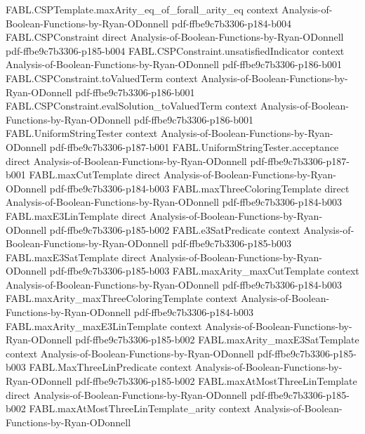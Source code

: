 \begin{theorem}
\proofstep
  {FABL.CSPTemplate.maxArity_eq_of_forall_arity_eq}
  {context}
  {Analysis-of-Boolean-Functions-by-Ryan-ODonnell}
  {pdf-ffbe9c7b3306-p184-b004}
\proofstep
  {FABL.CSPConstraint}
  {direct}
  {Analysis-of-Boolean-Functions-by-Ryan-ODonnell}
  {pdf-ffbe9c7b3306-p185-b004}
\proofstep
  {FABL.CSPConstraint.unsatisfiedIndicator}
  {context}
  {Analysis-of-Boolean-Functions-by-Ryan-ODonnell}
  {pdf-ffbe9c7b3306-p186-b001}
\proofstep
  {FABL.CSPConstraint.toValuedTerm}
  {context}
  {Analysis-of-Boolean-Functions-by-Ryan-ODonnell}
  {pdf-ffbe9c7b3306-p186-b001}
\proofstep
  {FABL.CSPConstraint.evalSolution_toValuedTerm}
  {context}
  {Analysis-of-Boolean-Functions-by-Ryan-ODonnell}
  {pdf-ffbe9c7b3306-p186-b001}
\proofstep
  {FABL.UniformStringTester}
  {context}
  {Analysis-of-Boolean-Functions-by-Ryan-ODonnell}
  {pdf-ffbe9c7b3306-p187-b001}
\proofstep
  {FABL.UniformStringTester.acceptance}
  {direct}
  {Analysis-of-Boolean-Functions-by-Ryan-ODonnell}
  {pdf-ffbe9c7b3306-p187-b001}
\proofstep
  {FABL.maxCutTemplate}
  {direct}
  {Analysis-of-Boolean-Functions-by-Ryan-ODonnell}
  {pdf-ffbe9c7b3306-p184-b003}
\proofstep
  {FABL.maxThreeColoringTemplate}
  {direct}
  {Analysis-of-Boolean-Functions-by-Ryan-ODonnell}
  {pdf-ffbe9c7b3306-p184-b003}
\proofstep
  {FABL.maxE3LinTemplate}
  {direct}
  {Analysis-of-Boolean-Functions-by-Ryan-ODonnell}
  {pdf-ffbe9c7b3306-p185-b002}
\proofstep
  {FABL.e3SatPredicate}
  {context}
  {Analysis-of-Boolean-Functions-by-Ryan-ODonnell}
  {pdf-ffbe9c7b3306-p185-b003}
\proofstep
  {FABL.maxE3SatTemplate}
  {direct}
  {Analysis-of-Boolean-Functions-by-Ryan-ODonnell}
  {pdf-ffbe9c7b3306-p185-b003}
\proofstep
  {FABL.maxArity_maxCutTemplate}
  {context}
  {Analysis-of-Boolean-Functions-by-Ryan-ODonnell}
  {pdf-ffbe9c7b3306-p184-b003}
\proofstep
  {FABL.maxArity_maxThreeColoringTemplate}
  {context}
  {Analysis-of-Boolean-Functions-by-Ryan-ODonnell}
  {pdf-ffbe9c7b3306-p184-b003}
\proofstep
  {FABL.maxArity_maxE3LinTemplate}
  {context}
  {Analysis-of-Boolean-Functions-by-Ryan-ODonnell}
  {pdf-ffbe9c7b3306-p185-b002}
\proofstep
  {FABL.maxArity_maxE3SatTemplate}
  {context}
  {Analysis-of-Boolean-Functions-by-Ryan-ODonnell}
  {pdf-ffbe9c7b3306-p185-b003}
\proofstep
  {FABL.MaxThreeLinPredicate}
  {context}
  {Analysis-of-Boolean-Functions-by-Ryan-ODonnell}
  {pdf-ffbe9c7b3306-p185-b002}
\proofstep
  {FABL.maxAtMostThreeLinTemplate}
  {direct}
  {Analysis-of-Boolean-Functions-by-Ryan-ODonnell}
  {pdf-ffbe9c7b3306-p185-b002}
\proofstep
  {FABL.maxAtMostThreeLinTemplate_arity}
  {context}
  {Analysis-of-Boolean-Functions-by-Ryan-ODonnell}

\end{theorem}
